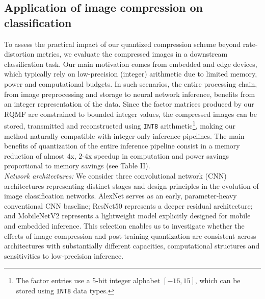 \documentclass[lettersize,journal]{IEEEtran}
\begin{document}
\subsection{Application of  image  compression on classification}
\noindent To assess the practical impact of our quantized compression scheme beyond rate-distortion metrics, we evaluate the compressed images in a downstream classification task. Our main motivation comes from embedded and edge devices, which typically rely on low-precision (integer) arithmetic due to limited memory, power and computational budgets. In such scenarios, the entire processing chain, from image preprocessing and storage to neural network inference, benefits from an integer representation of the data. Since the factor matrices produced by our RQMF are constrained to bounded integer values, the compressed images can be stored, transmitted and reconstructed using \texttt{INT8} arithmetic\footnote{The factor entries use a 5-bit integer alphabet \([-16,15]\), which can be stored using \texttt{INT8} data types.}, making our method naturally compatible with integer-only inference pipelines. The main benefits of quantization of the entire inference pipeline consist in a memory reduction of almost $4$x, $2$-$4$x speedup in computation and power savings proportional to memory savings (see Table II). \\

\noindent \textit{Network architectures:}  We consider three convolutional network (CNN) architectures representing distinct stages and design principles in the evolution of image classification networks. AlexNet serves as an early, parameter-heavy conventional CNN baseline; ResNet50 represents a deeper residual architecture; and MobileNetV2 represents a lightweight model explicitly designed for mobile and embedded inference. This selection enables us to investigate whether the effects of image compression and post-training quantization are consistent across architectures with substantially different capacities, computational structures and sensitivities to low-precision inference.

\end{document}
